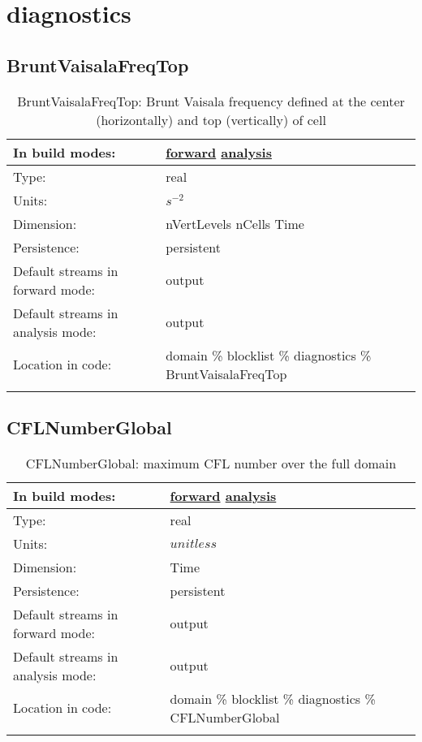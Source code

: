 \section[diagnostics]{diagnostics}
\label{sec:var_sec_diagnostics}
\subsection[BruntVaisalaFreqTop]{BruntVaisalaFreqTop}
\label{subsec:var_sec_diagnostics_BruntVaisalaFreqTop}
\begin{center}
\begin{longtable}{| p{2.0in} | p{4.0in} |}
        \hline 
        In build modes: & \hyperref[subsec:forward_var_tab_diagnostics]{forward} \hyperref[subsec:analysis_var_tab_diagnostics]{analysis} \\
        \hline 
        Type: & real \\
        \hline 
        Units: & $s^{-2}$ \\
        \hline 
        Dimension: & nVertLevels nCells Time \\
        \hline 
        Persistence: & persistent \\
        \hline 
		 Default streams in forward mode: &  output \\
        \hline 
		 Default streams in analysis mode: &  output \\
        \hline 
		 Location in code: & domain \% blocklist \% diagnostics \% BruntVaisalaFreqTop \\
		 \hline 
    \caption{BruntVaisalaFreqTop: Brunt Vaisala frequency defined at the center (horizontally) and top (vertically) of cell}
\end{longtable}
\end{center}
\subsection[CFLNumberGlobal]{CFLNumberGlobal}
\label{subsec:var_sec_diagnostics_CFLNumberGlobal}
\begin{center}
\begin{longtable}{| p{2.0in} | p{4.0in} |}
        \hline 
        In build modes: & \hyperref[subsec:forward_var_tab_diagnostics]{forward} \hyperref[subsec:analysis_var_tab_diagnostics]{analysis} \\
        \hline 
        Type: & real \\
        \hline 
        Units: & $unitless$ \\
        \hline 
        Dimension: & Time \\
        \hline 
        Persistence: & persistent \\
        \hline 
		 Default streams in forward mode: &  output \\
        \hline 
		 Default streams in analysis mode: &  output \\
        \hline 
		 Location in code: & domain \% blocklist \% diagnostics \% CFLNumberGlobal \\
		 \hline 
    \caption{CFLNumberGlobal: maximum CFL number over the full domain}
\end{longtable}
\end{center}
